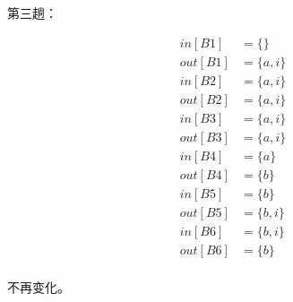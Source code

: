 \documentclass[UTF8]{ctexart}
\begin{document}
第三趟：

\begin{align*}
    in[B1] &= \{\} \\
    out[B1] &= \{a, i\} \\
    in[B2] &= \{a, i\} \\
    out[B2] &= \{a, i\} \\
    in[B3] &= \{a, i\} \\
    out[B3] &= \{a, i\} \\
    in[B4] &= \{a\} \\
    out[B4] &= \{b\} \\
    in[B5] &= \{b\} \\
    out[B5] &= \{b, i\} \\
    in[B6] &= \{b, i\} \\
    out[B6] &= \{b\} \\
\end{align*}

不再变化。
\end{document}
